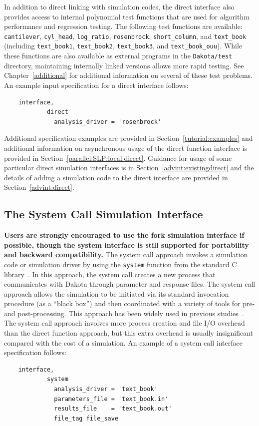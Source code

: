 In addition to direct linking with simulation codes, the direct
interface also provides access to internal polynomial test functions
that are used for algorithm performance and regression testing. The
following test functions are available: \texttt{cantilever},
\texttt{cyl\_head}, \texttt{log\_ratio}, \texttt{rosenbrock},
\texttt{short\_column}, and \texttt{text\_book} (including
\texttt{text\_book1}, \texttt{text\_book2}, \texttt{text\_book3}, and
\texttt{text\_book\_ouu}). While these functions are also available
as external programs in the \texttt{Dakota/test} directory,
maintaining internally linked versions allows more rapid testing. See
Chapter~\ref{additional} for additional information on several of
these test problems. An example input specification for a direct
interface follows:
\begin{small}
\begin{verbatim}
    interface,
            direct
              analysis_driver = 'rosenbrock'
\end{verbatim}
\end{small}

Additional specification examples are provided in
Section~\ref{tutorial:examples} and additional information on
asynchronous usage of the direct function interface is provided in
Section~\ref{parallel:SLP:local:direct}.  Guidance for usage of some
particular direct simulation interfaces is in
Section~\ref{advint:existingdirect} and the details of adding a
simulation code to the direct interface are provided in
Section~\ref{advint:direct}.

\subsection{The System Call Simulation Interface}\label{interfaces:system}

{\bf Users are strongly encouraged to use the fork simulation
  interface if possible, though the system interface is still
  supported for portability and backward compatibility.}  The system
call approach invokes a simulation code or simulation driver by using
the \texttt{system} function from the standard C
library~\cite{Ker88}. In this approach, the system call creates a new
process that communicates with Dakota through parameter and response
files.  The system call approach allows the simulation to be initiated
via its standard invocation procedure (as a ``black box'') and then
coordinated with a variety of tools for pre- and post-processing.
This approach has been widely used in previous
studies~\cite{Eld96a,Eld96b,Eld98b}. The system call approach involves
more process creation and file I/O overhead than the direct function
approach, but this extra overhead is usually insignificant compared
with the cost of a simulation.  An example of a system call interface
specification follows:
\begin{small}
\begin{verbatim}
    interface,
            system
              analysis_driver = 'text_book'
              parameters_file = 'text_book.in'
              results_file    = 'text_book.out'
              file_tag file_save
\end{verbatim}
\end{small}

